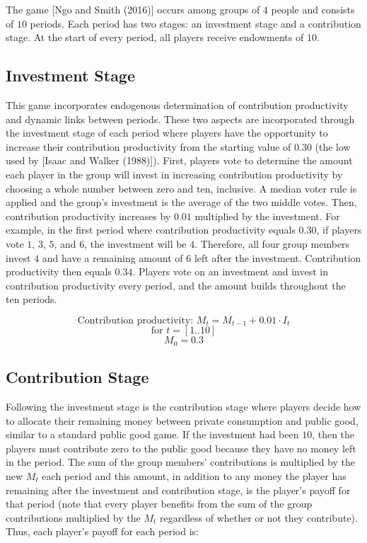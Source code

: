 	The game [Ngo and Smith (2016)] occurs among groups of $4$ people and consists of $10$ periods. Each period has two stages: an investment stage and a contribution stage. At the start of every period, all players receive endowments of $10$.
	
	\subsection{Investment Stage}
	
		This game incorporates endogenous determination of contribution productivity and dynamic links between periods. These two aspects are incorporated through the investment stage of each period where players have the opportunity to increase their contribution productivity from the starting value of $0.30$ (the low used by [Isaac and Walker (1988)]). First, players vote to determine the amount each player in the group will invest in increasing contribution productivity by choosing a whole number between zero and ten, inclusive. A median voter rule is applied and the group's investment is the average of the two middle votes. Then, contribution productivity increases by $0.01$ multiplied by the investment. For example, in the first period where contribution productivity equals $0.30$, if players vote $1$, $3$, $5$, and $6$, the investment will be $4$. Therefore, all four group members invest $4$ and have a remaining amount of $6$ left after the investment. Contribution productivity then equals $0.34$. Players vote on an investment and invest in contribution productivity every period, and the amount builds throughout the ten periods.

		\[
			\text{Contribution productivity: } M_t = M_{t-1} + 0.01 \cdot I_t
		\]
		\[
			\text{for } t = [1..10]
		\]
		\[
			M_0 = 0.3
		\]
	
	\subsection{Contribution Stage}
	
		Following the investment stage is the contribution stage where players decide how to allocate their remaining money between private consumption and public good, similar to a standard public good game. If the investment had been $10$, then the players must contribute zero to the public good because they have no money left in the period. The sum of the group members' contributions is multiplied by the new $M_t$ each period and this amount, in addition to any money the player has remaining after the investment and contribution stage, is the player's payoff for that period (note that every player benefits from the sum of the group contributions multiplied by the $M_t$ regardless of whether or not they contribute). Thus, each player's payoff for each period is:

